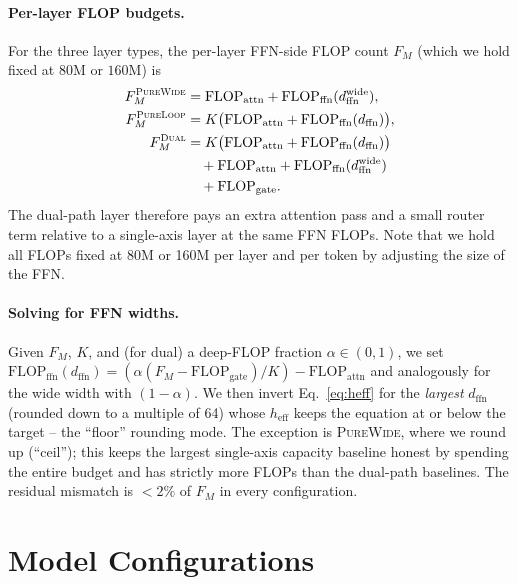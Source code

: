 \documentclass[11pt]{article}
\begin{document}
\paragraph{Per-layer FLOP budgets.}
For the three layer types, the per-layer FFN-side FLOP count
$F_M$ (which we hold fixed at $80$M or $160$M) is
\begin{align}
F_M^{\textsc{PureWide}}
  &= \mathrm{FLOP}_{\text{attn}}
   + \mathrm{FLOP}_{\text{ffn}}(d_{\text{ffn}}^{\text{wide}}), \\
F_M^{\textsc{PureLoop}}
  &= K \bigl(\mathrm{FLOP}_{\text{attn}}
   + \mathrm{FLOP}_{\text{ffn}}(d_{\text{ffn}})\bigr), \\
F_M^{\textsc{Dual}}
  &= K \bigl(\mathrm{FLOP}_{\text{attn}}
   + \mathrm{FLOP}_{\text{ffn}}(d_{\text{ffn}})\bigr) \nonumber \\
  &\quad{}+ \mathrm{FLOP}_{\text{attn}}
   + \mathrm{FLOP}_{\text{ffn}}(d_{\text{ffn}}^{\text{wide}}) \nonumber \\
  &\quad{}+ \mathrm{FLOP}_{\text{gate}}.
\end{align}
The dual-path layer therefore pays an extra attention pass and a
small router term relative to a single-axis layer at the same
FFN FLOPs. Note that we hold all FLOPs fixed at 80M or 160M per layer and per token by adjusting the size of the FFN.

\paragraph{Solving for FFN widths.}
Given $F_M$, $K$, and (for dual) a deep-FLOP fraction
$\alpha \in (0,1)$, we set
$\mathrm{FLOP}_{\text{ffn}}(d_{\text{ffn}})
  = (\alpha (F_M - \mathrm{FLOP}_{\text{gate}}) / K)
  - \mathrm{FLOP}_{\text{attn}}$
and analogously for the wide width with $(1-\alpha)$. We then
invert Eq.~\ref{eq:heff} for the \emph{largest} $d_{\text{ffn}}$
(rounded down to a multiple of 64) whose $h_{\text{eff}}$ keeps
the equation at or below the target -- the ``floor'' rounding
mode. The exception is \textsc{PureWide}, where we round up
(``ceil''); this keeps the largest single-axis capacity baseline
honest by spending the entire budget and has strictly more FLOPs than the dual-path baselines. The residual mismatch is $<2\%$ of
$F_M$ in every configuration. 

\section{Model Configurations}
\label{sec:app:configs}
\end{document}
